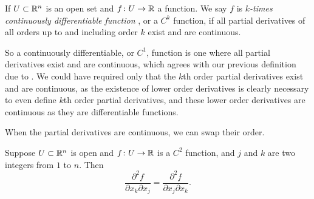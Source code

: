 \begin{defn}
If $U \subset {\mathbb{R}}^n$ is an open set and
$f \colon U \to {\mathbb{R}}$ a function.  We say $f$ is
\emph{$k$-times continuously differentiable function}%
,
or a $C^k$ function, if all partial derivatives of all orders up to and
including order $k$ exist and are continuous.
\end{defn}

So a continuously differentiable, or $C^1$, function is one where all partial
derivatives exist and are continuous, which agrees with our previous
definition due to .  We
could have required only that the $k$th order partial derivatives exist and
are continuous, as the existence of lower order derivatives is clearly
necessary to even define $k$th order partial derivatives,
and these lower order derivatives are continuous as they are differentiable
functions.

When the partial derivatives are continuous, we can swap their order.

\begin{prop} \label{mv:prop:swapders}
Suppose $U \subset {\mathbb{R}}^n$ is open and $f \colon U \to {\mathbb{R}}$ is a $C^2$
function, and $j$ and $k$ are two integers from $1$ to $n$.  Then
\begin{equation*}
\frac{\partial^2 f}{\partial x_k \partial x_j}
=
\frac{\partial^2 f}{\partial x_j \partial x_k} .
\end{equation*}
\end{prop}

